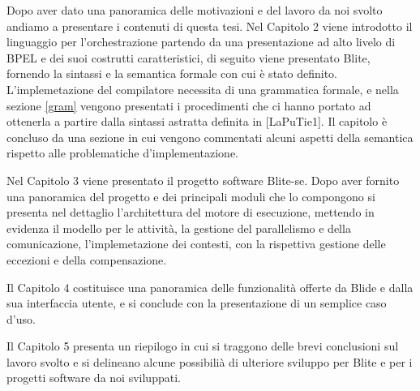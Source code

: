 % 

Dopo aver dato una panoramica delle motivazioni e del lavoro da noi svolto
andiamo a presentare i contenuti di questa tesi. Nel Capitolo 2 viene introdotto
il linguaggio per l'orchestrazione partendo da una presentazione ad alto livelo
di BPEL e dei suoi costrutti caratteristici, di seguito viene presentato Blite,
fornendo la sintassi e la semantica formale con cui è stato definito.
L'implemetazione del compilatore necessita di una grammatica formale, e nella
sezione \ref{gram} vengono presentati i procedimenti che ci hanno portato ad
ottenerla a partire dalla sintassi astratta definita in [LaPuTie1]. Il capitolo
è concluso da una sezione in cui vengono commentati alcuni aspetti della
semantica rispetto alle problematiche d'implementazione.

Nel Capitolo 3 viene presentato il progetto software Blite-se. Dopo aver
fornito una panoramica del progetto e dei principali moduli che lo compongono si
presenta nel dettaglio l'architettura del motore di esecuzione, mettendo in
evidenza il modello per le attività, la gestione del parallelismo e della
comunicazione, l'implemetazione dei contesti, con la rispettiva gestione delle
eccezioni e della compensazione.

Il Capitolo 4 costituisce una panoramica delle funzionalità offerte da Blide e
dalla sua interfaccia utente, e si conclude con la presentazione di un semplice
caso d'uso. 

Il Capitolo 5 presenta un riepilogo in cui si traggono delle brevi
conclusioni sul lavoro svolto e si delineano alcune possibilià di ulteriore
sviluppo per Blite e per i progetti software da noi sviluppati.
